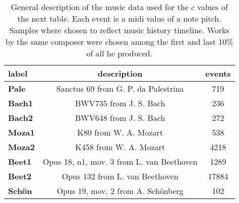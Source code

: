 \begin{table}[h!]
\begin{center}
\begin{tabular}{| l || c | c |}\hline
label & description & events \\\hline\hline
{\bf Pale} & Sanctus 69 from G. P. da Palestrina & 719 \\\hline\hline
{\bf Bach1} & BWV735 from J. S. Bach & 236 \\\hline
{\bf Bach2} & BWV648 from J. S. Bach & 272 \\\hline\hline
{\bf Moza1} & K80 from W. A. Mozart & 538 \\\hline
{\bf Moza2} & K458 from W. A. Mozart & 4218 \\\hline\hline
{\bf Beet1} & Opus 18, n1, mov. 3 from L. van Beethoven & 1289 \\\hline
{\bf Beet2} & Opus 132 from L. van Beethoven & 17884 \\\hline\hline
{\bf Sch\"on} & Opus 19, mov. 2 from A. Sch\"onberg & 102 \\\hline
\end{tabular}
\caption{General description of the music data used for the $c$ values of the next table. Each event is a midi value of a note pitch. Samples where chosen to reflect music history timeline. Works by the same composer were chosen among the first and last 10\% of all he produced.}
\end{center}
\end{table}